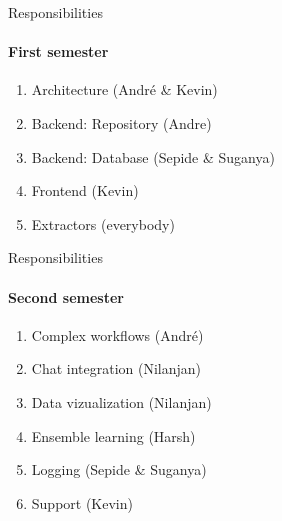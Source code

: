 \begin{frame}{Responsibilities}
\framesubtitle{First semester}
	\begin{enumerate}
		\item Architecture (André \& Kevin)
		\item Backend: Repository (Andre)
		\item Backend: Database (Sepide \& Suganya)
		\item Frontend (Kevin)
		\item Extractors (everybody)
	\end{enumerate}
\end{frame}

\begin{frame}{Responsibilities}
\framesubtitle{Second semester}
	\begin{enumerate}
		\item Complex workflows (André)
		\item Chat integration (Nilanjan)
		\item Data vizualization (Nilanjan)
		\item Ensemble learning  (Harsh)
		\item Logging (Sepide \& Suganya)
		\item Support (Kevin)
	\end{enumerate}
\end{frame}